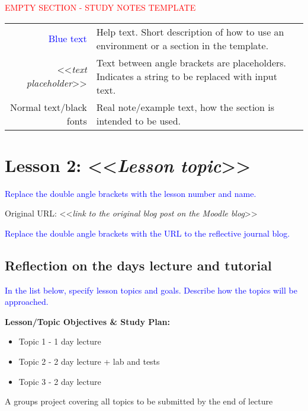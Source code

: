 

{\begin{center}
    \textcolor{red}{\Huge{EMPTY SECTION - STUDY NOTES TEMPLATE}}

    \begin{tabular}{r @{: } p{80mm}}
        {\textcolor{blue}{Blue text}} &  Help text. Short description of how to use an environment or a section in the template.\\
        <<{\emph{text placeholder}}>> & Text between angle brackets are placeholders. Indicates a string to be replaced with input text.\\
        Normal text/black fonts & Real note/example text, how the section is intended to be used.
    \end{tabular}

\end{center}


\section{Lesson 2: <<{\emph{Lesson topic}}>>}

{\textcolor{blue}{Replace the double angle brackets with the lesson number and name.}}

Original URL: <<{\emph{link to the original blog post on the Moodle blog}}>>

{\textcolor{blue}{Replace the double angle brackets with the URL to the reflective journal blog.}}


\subsection{Reflection on the days lecture and tutorial}

{\textcolor{blue}{In the list below, specify lesson topics and goals. Describe how the topics will be approached.}}

{\bfseries{Lesson/Topic Objectives \& Study Plan:}}
\begin{itemize}
    \item Topic 1 - 1 day lecture
    \item Topic 2 - 2 day lecture + lab and tests
    \item Topic 3 - 2 day lecture
\end{itemize}

A groups project covering all topics to be submitted by the end of lecture}

